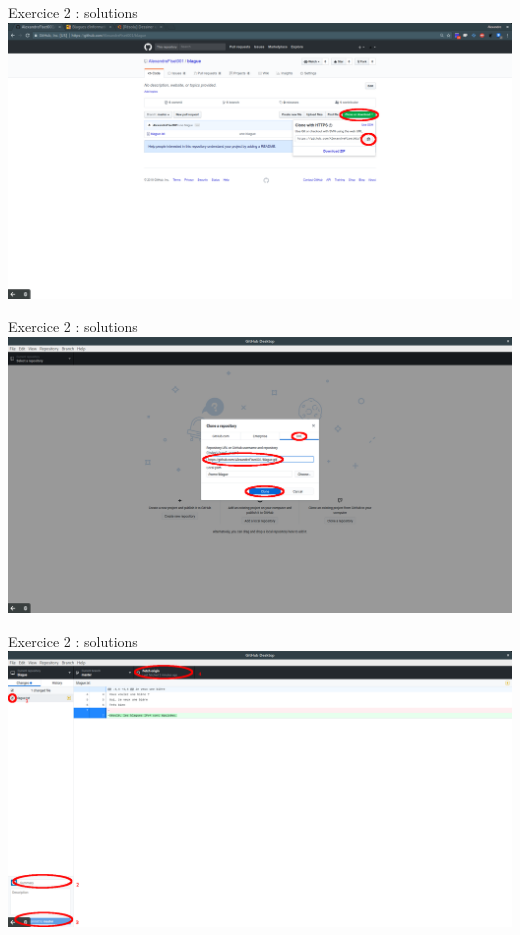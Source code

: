 \documentclass{beamer}
\begin{document}
\begin{frame}{Exercice 2 : solutions}
	\centering
    \includegraphics[scale=0.16]{img/image_exercices/get_url_all_time.png}
\end{frame}

\begin{frame}{Exercice 2 : solutions}
	\centering
    \includegraphics[scale=0.16]{img/image_exercices/cloning_with_url.png}
\end{frame}

\begin{frame}{Exercice 2 : solutions}
	\centering
    \includegraphics[scale=0.16]{img/image_exercices/fetch_for_merge.png}
\end{frame}
\end{document}
